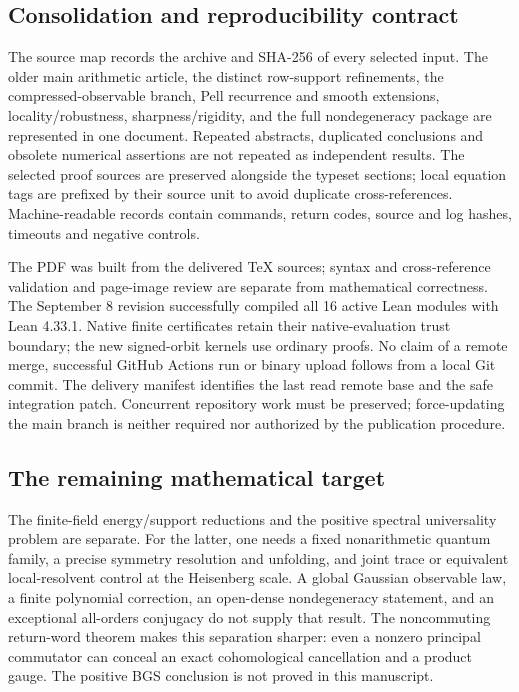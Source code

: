 \subsection{Consolidation and reproducibility contract}
The source map records the archive and SHA-256 of every selected input.
The older main arithmetic article, the distinct row-support refinements,
the compressed-observable branch, Pell recurrence and smooth extensions,
locality/robustness, sharpness/rigidity, and the full nondegeneracy package
are represented in one document. Repeated abstracts, duplicated conclusions
and obsolete numerical assertions are not repeated as independent results.
The selected proof sources are preserved alongside the typeset sections;
local equation tags are prefixed by their source unit to avoid duplicate
cross-references. Machine-readable records contain commands, return codes,
source and log hashes, timeouts and negative controls.

The PDF was built from the delivered TeX sources; syntax and cross-reference
validation and page-image review are separate from mathematical correctness.
The September 8 revision successfully compiled all 16 active Lean modules
with Lean 4.33.1. Native finite certificates retain their native-evaluation
trust boundary; the new signed-orbit kernels use ordinary proofs. No claim of a
remote merge, successful GitHub Actions run or binary upload follows from
a local Git commit. The delivery manifest identifies the last read remote
base and the safe integration patch. Concurrent repository work must be
preserved; force-updating the main branch is neither required nor authorized
by the publication procedure.

\subsection{The remaining mathematical target}
The finite-field energy/support reductions and the positive spectral
universality problem are separate. For the latter, one needs a fixed
nonarithmetic quantum family, a precise symmetry resolution and unfolding,
and joint trace or equivalent local-resolvent control at the Heisenberg scale.
A global Gaussian observable law, a finite polynomial correction, an
open-dense nondegeneracy statement, and an exceptional all-orders conjugacy
do not supply that result. The noncommuting return-word theorem makes this
separation sharper: even a nonzero principal commutator can conceal an exact
cohomological cancellation and a product gauge. The positive BGS conclusion
is not proved in this manuscript.

